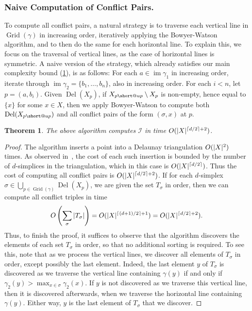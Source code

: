 \documentclass[11pt]{amsart}
\makeatletter
\DeclarePairedDelimiter\ceil{\lceil}{\rceil}
\DeclarePairedDelimiter\abs{\lvert}{\rvert}
\DeclareMathOperator{\DelT}{Del}
\DeclareMathOperator{\Grid}{\mathrm{Grid}}
\DeclareMathOperator{\im}{im}
\newcommand{\Incr}[0]{\mathcal{I}}
\DeclareRobustCommand{\subup}{%
  \mathrel{\mathpalette\short@up\relax}%
}
\newcommand{\short@up}[2]{%
  \mkern2mu
  \clipbox{0 {.35\height} 0 0}{$\m@th#1\vphantom{+}{\uparrow}$}%
}
\renewcommand{\subparagraph}[1]{\subsubsection*{\textbf{\textup{#1}}}}
\theoremstyle{plain}
\newtheorem{theorem}{Theorem}[section]
\theoremstyle{definition}
\theoremstyle{remark}
\newcommand{\SizeBound}{{\lceil (d+1)/2 \rceil + 1}}
\newcommand{\CompBound}{{\lceil d/2\rceil +2}}
\makeatother
\begin{document}
%
\subparagraph{Naive Computation of Conflict Pairs.}
To compute all conflict pairs, a natural strategy is to traverse each vertical line in $\Grid(\gamma)$ in increasing order, iteratively applying the Bowyer-Watson algorithm, and to then do the same for each horizontal line.  To explain this, we focus on the traversal of vertical lines, as the case of horizontal lines is symmetric.  A naive version of the strategy, which already satisfies our main complexity bound (\cref{Thm:Time_Bound}), is as follows: For each $a\in \im \gamma_1$ in increasing order, iterate through $\im \gamma_2=\{b_1,\ldots,b_n\}$, also in increasing order.  For each $i < n$, let $p=(a,b_i)$.   Given $\DelT(X_{p})$,  if $X_{p{\subup}}\setminus X_{p}$ is non-empty, hence equal to $\{x\}$ for some $x\in X$, then we apply Bowyer-Watson to compute both $\DelT(X_{p{\subup}})$ and all conflict pairs of the form $(\sigma,x)$ at $p$.  
%
\begin{theorem}\label{Thm:Time_Bound}
The above algorithm computes $\Incr$ in time $O(\abs{X}^{\ceil{d/2}+2})$.
\end{theorem}
\begin{proof}
The algorithm inserts a point into a Delaunay triangulation $O(\abs{X}^{2})$ times.  As observed in~\cite[Section 2]{alonsoDelaunayBifiltrationsFunctions2024},  the cost of each such insertion is bounded by the number of $d$-simplices in the triangulation, which in this case is $O(\abs{X}^{\ceil{d/2}})$.  Thus the cost of computing all conflict pairs is $O(\abs{X}^\CompBound)$.  
%
If for each $d$-simplex $\sigma\in \bigcup_{p\in \Grid(\gamma)} \DelT(X_p)$, we are given the set $T_{\sigma}$ in order, then we can compute all conflict triples in time \[O\left(\sum_{\sigma} |T_{\sigma}|\right)=O(\abs{X}^{\SizeBound})=O(\abs{X}^\CompBound).\]  Thus, to finish the proof, it suffices to observe that the algorithm discovers the elements of each set $T_{\sigma}$ in order, so that no additional sorting is required.  To see this, note that as we process the vertical lines, we discover all elements of $T_{\sigma}$ in order,  except possibly the last element.  Indeed, the last element $y$ of $T_{\sigma}$ is discovered as we traverse the vertical line containing $\gamma(y)$ if and only if $\gamma_2(y)> \max_{x\in \sigma} \gamma_2(x)$.  If $y$ is not discovered as we traverse this vertical line, then it is discovered afterwards, when we traverse the horizontal line containing $\gamma(y)$.  Either way, $y$ is the last element of $T_{\sigma}$ that we discover.
\end{proof}
%
%
%
\end{document}
